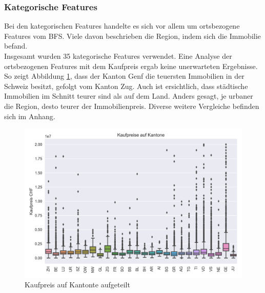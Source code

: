 \subsubsection{Kategorische Features}
Bei den kategorischen Features handelte es sich vor allem um ortsbezogene Features vom BFS. Viele davon beschrieben die Region, indem sich die Immobilie befand.\\
Insgesamt wurden 35 kategorische Features verwendet. Eine Analyse der ortsbezogenen Features mit dem Kaufpreis ergab keine unerwarteten Ergebnisse. So zeigt Abbildung \ref{fig:cantons}, dass der Kanton Genf die teuersten Immobilien in der Schweiz besitzt, gefolgt vom Kanton Zug. Auch ist ersichtlich, dass städtische Immobilien im Schnitt teurer sind als auf dem Land. Anders gesagt, je urbaner die Region, desto teurer der Immobilienpreis. Diverse weitere Vergleiche befinden sich im Anhang.\\[2ex]
\begin{figure}[ht]
\centering
\includegraphics[width=\textwidth]{images/boxPlot_cantons.png}
\caption[Kaufpreis auf Kantonte aufgeteilt]{Kaufpreis auf Kantonte aufgeteilt}%
\label{fig:cantons}
\end{figure}

